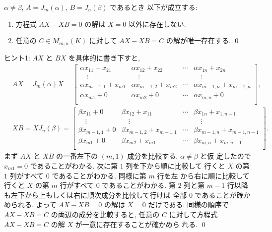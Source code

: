 \documentclass[12pt,twoside]{jarticle}
\begin{document}

\begin{question}
\label{q:alpha-ne-beta}
  $\alpha\ne\beta$, $A=J_m(\alpha)$, $B=J_n(\beta)$ であるとき
  以下が成立する:
  \begin{enumerate}
  \item 方程式 $AX-XB=0$ の解は $X=0$ 以外に存在しない.
  \item 任意の $C\in M_{m,n}(K)$ に対して $AX-XB=C$ の解が唯一存在する.
    \qed
  \end{enumerate}
\end{question}

\noindent
ヒント1: $AX$ と $BX$ を具体的に書き下すと,
\begin{align*}
  &
  AX = J_m(\alpha)X =
  \left[
  \begin{array}{llcl}
    \alpha x_{11}    + x_{21} & \alpha x_{12}    + x_{22} & \cdots & \alpha x_{1n}    + x_{2n} \\
    \quad\vdots               & \quad\vdots               &        & \quad\vdots \\
    \alpha x_{m-1,1} + x_{m1} & \alpha x_{m-1,2} + x_{m2} & \cdots & \alpha x_{m-1,n} + x_{m-1,n} \\
    \alpha x_{m1}    + 0      & \alpha x_{m2}    + 0      & \cdots & \alpha x_{m,n}   + 0 \\
  \end{array}
  \right],
  \\ &
  XB = XJ_n(\beta) =
  \left[
  \begin{array}{llcl}
    \beta x_{11}    + 0 & \beta x_{12}    + x_{11}    & \cdots & \beta x_{1n}    + x_{1,n-1} \\
    \quad\vdots         & \quad\vdots                 &        & \quad\vdots \\
    \beta x_{m-1,1} + 0 & \beta x_{m-1,2} + x_{m-1,1} & \cdots & \beta x_{m-1,n} + x_{m-1,n-1} \\
    \beta x_{m1}    + 0 & \beta x_{m2}    + x_{m1}    & \cdots & \beta x_{m,n}   + x_{m,n-1} \\
  \end{array}
  \right].
\end{align*}
まず $AX$ と $XB$ の一番左下の $(m,1)$ 成分を比較する. $\alpha\ne\beta$ と仮
定したので $x_{m1}=0$ であることがわかる.  次に第 $1$ 列を下から順に比較して
行くと $X$ の第 $1$ 列がすべて $0$ であることがわかる.  同様に第 $m$ 行を左
から右に順に比較して行くと $X$ の第 $m$ 行がすべて $0$ であることがわかる.
第 $2$ 列と第 $m-1$ 行以降も左下から上もしくは右に順次成分を比較して行けば
全部 $0$ であることが確かめられる.  よって $AX-XB=0$ の解は $X=0$ だけである.
同様の順序で $AX-XB=C$ の両辺の成分を比較すると, 
任意の $C$ に対して方程式 $AX-XB=C$ の解 $X$ が一意に存在することが確かめら
れる.
\qed
\end{document}
